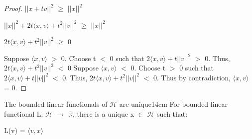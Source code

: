 \begin{proof}
        \hspace{0.5cm}
        $||x+tv||^2$ $\geq$ $||x||^2$

        \hspace{0.5cm}
        $||x||^2 + 2t \langle x , v \rangle + t^2 ||v||^2$ $\geq$ $||x||^2$

        \hspace{0.5cm}
        $2t \langle x , v \rangle + t^2 ||v||^2$ $\geq$ 0

        Suppose $\langle x , v \rangle$ $>$ 0. Choose t $<$ 0
        such that $2 \langle x , v \rangle + t ||v||^2$ $>$ 0.
        Thus, $2t \langle x , v \rangle + t^2 ||v||^2$ $<$ 0
        Suppose $\langle x , v \rangle$ $<$ 0. Choose t $>$ 0
        such that $2 \langle x , v \rangle + t ||v||^2$ $<$ 0.
        Thus, $2t \langle x , v \rangle + t^2 ||v||^2$ $<$ 0.
        Thus by contradiction, $\langle x , v \rangle$ = 0.
    \end{proof}

    \vspace{0.5cm}



    \begin{wtheorem}{The bounded linear functionals of $\mathcal{H}$ are unique}{14cm}
        For bounded linear functional L: $\mathcal{H}$ $\rightarrow$ $\mathbb{R}$,
        there is a unique x $\in$ $\mathcal{H}$ such that:

        \hspace{0.5cm}
        L(v) = $\langle v , x \rangle$
    \end{wtheorem}

